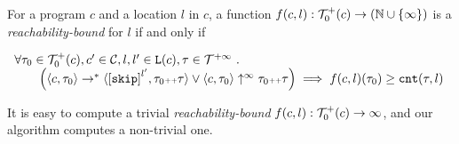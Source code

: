 \begin{defn}
 \label{def:rb}
 For a program ${c}$ and a location $l$ in $c$,
a function $f(c, l) : \mathcal{T}^{+}_0(c) \to (\mathbb{N} \cup \{\infty\})$ is a \emph{reachability-bound} for $l$ if and only if
{\small
\begin{center}
 $
\begin{array}{ll}
 \forall \trace_0 \in \ftdom_0(c), c' \in \cdom, l, l' \in \lvar(c), \trace \in \tdom \st 
 \\ \qquad
 \Big(
 \config{{c}, \trace_0} \to^{*} \config{\clabel{\eskip}^{l'}, \trace_0 \tracecat \trace} 
 \lor 
 \config{{c}, \trace_0} \uparrow^{\infty} \trace_0 \tracecat \trace 
 \Big)
 \implies f({c}, l)(\trace_0) \geq \counter(\trace, l) 
 \end{array}
 $
\end{center}
}
\end{defn}
It is easy to compute a trivial \emph{reachability-bound} $f(c, l): \mathcal{T}^{+}_0(c) \to \infty$, and 
our algorithm computes a non-trivial one.